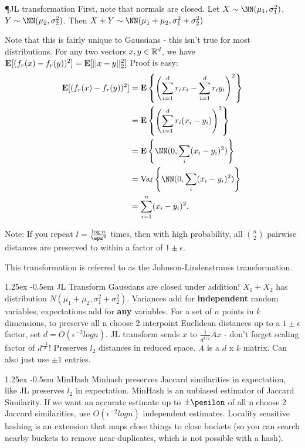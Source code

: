 \documentclass[8pt]{article}
\makeatletter
\newlength{\norm}
\newlength{\nrm}
\renewcommand{\paragraph}{%
  \@startsection{paragraph}{4}%
  {\z@}{1.25ex \@plus 2pt \@minus 2pt}{-0.5em}%
  {\fontsize{\f@size}{\nrm}\normalfont\bfseries}%
}
\makeatother
\begin{document}
{\begin{multicols*}{5}
  \P{JL transformation} First, note that normals are closed.  Let $X \sim \NN(\mu_1, \sigma_1^2)$, $Y \sim \NN(\mu_2, \sigma_2^2)$.  Then $X+Y \sim \NN(\mu_1 + \mu_2, \sigma_1^2 + \sigma_2^2)$

Note that this is fairly unique to Gaussians - this isn't true for most distributions. For any two vectors $x, y \in \mathbb{R}^d$, we have $\mathbf{E} [ (f_r(x) - f_r(y))^2 ] = \mathbf{E} [ ||x - y||_2^2 ]$
Proof is easy:
  \begin{align*}
    \EE [ (f_r(x) -  f_r(y))^2 ] &= \EE \left\{ \left( \sum_{i=1}^{d} r_i x_i - \sum_{i=1}^{d} r_i y_i \right)^2 \right\} \\
    &= \EE \left\{ \left( \sum_{i=1}^{d} r_i (x_i - y_i) \right)^2 \right\} \\
    &= \EE \left\{ \NN (0, \sum_i (x_i-y_i)^2) \right\} \\
    &= \Var \left\{ \NN (0, \sum_{i} (x_i - y_i)^2) \right\} \\
    &= \sum_{i=1}^{n} (x_i - y_i)^2.
  \end{align*}

  Note: If you repeat $l = \frac{\log n}{\eps^2}$ times, then with high probability, all $\binom{n}{2}$ pairwise distances are preserved to within a factor of $1 \pm \epsilon$.

This transformation is referred to as the Johnson-Lindenstrauss transformation.


\paragraph{JL Transform} Gaussians are closed under addition! $X_1 + X_2$ has distribution $N(\mu_1 + \mu_2, \sigma_1^2 + \sigma_2^2)$. Variances add for \textbf{independent} random variables, expectations add for \textbf{any} variables. For a set of $n$ points in $k$ dimensions, to preserve all n choose 2 interpoint Euclidean distances up to a $1 \pm \epsilon$ factor, set $d = O(\epsilon^{-2}logn)$. JL transform sends $x$ to $\frac{1}{d^{1/2}}Ax$ - don't forget scaling factor of $d^\frac{-1}{2}$! Preserves $l_2$ distances in reduced space. $A$ is a $d$ x $k$ matrix. Can also just use $\pm 1$ entries.

\paragraph{MinHash} Minhash preserves Jaccard similarities in expectation, like JL preserves $l_2$ in expectation. MinHash is an unbiased estimator of Jaccard Similarity. If we want an accurate estimate up to $\pm \pesilon$ of all n choose 2 Jaccard similarities, use $O(\epsilon^{-2}logn)$ independent estimates. Locality sensitive hashing is an extension that maps close things to close buckets (so you can search nearby buckets to remove near-duplicates, which is not possible with a hash).




\end{multicols*}}
\end{document}
